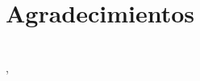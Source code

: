     \chapter*{Agradecimientos} %
    
     
    
    \makeatletter		
    \begin{flushright}
    	\vspace{1,5cm}
    	\textit{\@autor}\\
    	\@lugarDef, \@yearDef
    \end{flushright}
    \makeatother
    
    
    

